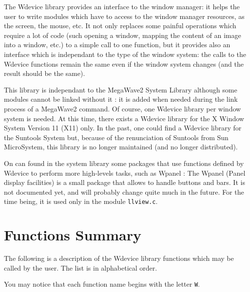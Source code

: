 %
%

The Wdevice library provides an interface to the window manager: 
it helps the user to write modules which have to access to the window manager resources, as the screen, the mouse, etc.
It not only replaces some painful operations which require a lot of code (such opening a window, mapping the content of an image into a window, etc.) to a simple call to one function, but it provides also an interface which is independant to the type of the window system: the calls to the Wdevice functions remain the same even if the window system changes (and the result should be the same).

This library is independant to the MegaWave2 System Library although some modules cannot be linked
without it : it is added when needed during the link process of a MegaWave2 command.
Of course, one Wdevice library per window system is needed. 
At this time, there exists a Wdevice library for the X Window System Version 11
(X11) only.
In the past, one could find a Wdevice library for the Suntools System but, because of the 
renunciation of Suntools from Sun MicroSystem, this library is no longer maintained 
(and no longer distributed).

On can found in the system library some packages that use functions defined by Wdevice to perform
more high-levels tasks, such as Wpanel :
The Wpanel (Panel display facilities) is a small package that allows to 
handle buttons and bars. It is not documented yet, and will probably change quite much in the future. For the time 
being, it is used only in the module \verb+llview.c+.

\section{Functions Summary}
\label{wdevice_function}

The following is a description of the Wdevice library functions 
which may be called by the user. 
The list is in alphabetical order.

You may notice that each function name begins with the letter \verb+W+.


